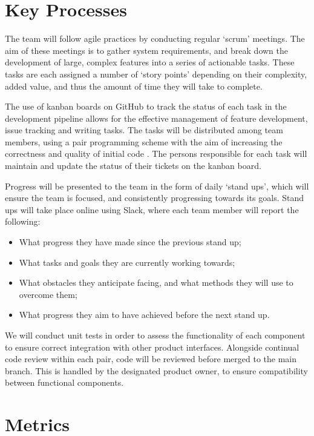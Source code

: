 \section{Key Processes}
The team will follow agile practices by conducting regular `scrum’ meetings. The aim of these meetings is to gather system requirements, and break down the development of large, complex features into a series of actionable tasks. These tasks are each assigned a number of `story points’ depending on their complexity, added value, and thus the amount of time they will take to complete.

The use of kanban boards on GitHub to track the status of each task in the development pipeline allows for the effective management of feature development, issue tracking and writing tasks. The tasks will be distributed among team members, using a pair programming scheme with the aim of increasing the correctness and quality of initial code \cite{hannay2009effectiveness}. The persons responsible for each task will maintain and update the status of their tickets on the kanban board.

Progress will be presented to the team in the form of daily `stand ups’, which will ensure the team is focused, and consistently progressing towards its goals. Stand ups will take place online using Slack, where each team member will report the following:

\begin{itemize}[noitemsep,topsep=0pt]
	\item What progress they have made since the previous stand up;
	\item What tasks and goals they are currently working towards;
	\item What obstacles they anticipate facing, and what methods they will use to overcome them;
	\item What progress they aim to have achieved before the next stand up.
\end{itemize}

We will conduct unit tests in order to assess the functionality of each component to ensure correct integration with other product interfaces. Alongside continual code review within each pair, code will be reviewed before merged to the main branch. This is handled by the designated product owner, to ensure compatibility between functional components.

\section{Metrics}

